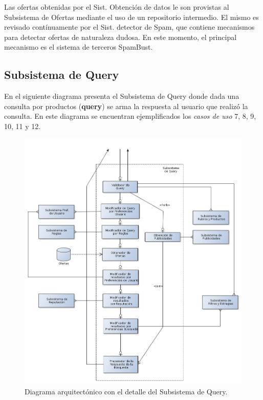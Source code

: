 Las ofertas obtenidas por el \textsf{Sist. Obtención de datos} le son provistas al \textsf{Subsistema de Ofertas} mediante el uso de un repositorio intermedio.
El mismo es revisado contínuamente por el \textsf{Sist. detector de Spam}, que contiene mecanismos para detectar ofertas de naturaleza dudosa. En este momento, el principal mecanismo es el sistema de terceros \textsf{SpamBust}.

\subsection{Subsistema de Query}

En el siguiente diagrama presenta el \textsf{Subsistema de Query} donde dada una consulta por productos (\textbf{query}) se arma la respuesta al usuario que realizó la consulta. En este diagrama se encuentran ejemplificados los \emph{casos de uso} 7, 8, 9, 10, 11 y 12.

\begin{figure}[H]
	\centering
	\includegraphics[width=\textwidth]{graficos/arch/subsistema_query.png}
	\caption{Diagrama arquitectónico con el detalle del \textsf{Subsistema de Query}.}
\end{figure}

